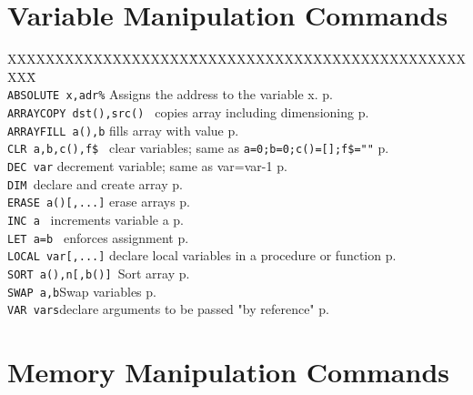 \section{Variable Manipulation Commands}

\begin{tabbing}
XXXXXXXXXXXXXXXXXXX\=XXXXXXXXXXXXXXXXXXXXXXXXXXXXXXXX\=\kill\\

\verb|ABSOLUTE x,adr%|\> Assigns the address to the variable x.\> p.\pageref{ABSOLUTE}\\
{\tt ARRAYCOPY dst(),src() }\> copies array including dimensioning\> p.\pageref{ARRAYCOPY}\\
\verb|ARRAYFILL a(),b|\> fills array with value\> p.\pageref{ARRAYFILL}\\
{\tt CLR a,b,c(),f\$ }	\> clear variables; same as \verb|a=0;b=0;c()=[];f$=""|\> p.\pageref{CLR}\\
\verb|DEC var|          \> decrement variable; same as var=var-1\> p.\pageref{DEC} \\
{\tt DIM		 }\>declare and create array\> p.\pageref{DIM} \\
{\tt ERASE a()[,...]}\> erase arrays\> p.\pageref{ERASE} \\
{\tt INC a  		}\> increments variable a\> p.\pageref{INC} \\
{\tt LET a=b 		}\> enforces assignment\> p.\pageref{LET} \\
{\tt LOCAL var[,...]}\> declare local variables in a procedure or function\> p.\pageref{LOCAL} \\	 
{\tt SORT a(),n[,b()]	}\>Sort array\> p.\pageref{SORT} \\
{\tt SWAP a,b}\>Swap variables\> p.\pageref{SWAP} \\
{\tt VAR vars}\>declare arguments to be passed "by reference"\> p.\pageref{VAR} \\
\end{tabbing}

\section{Memory Manipulation Commands}

